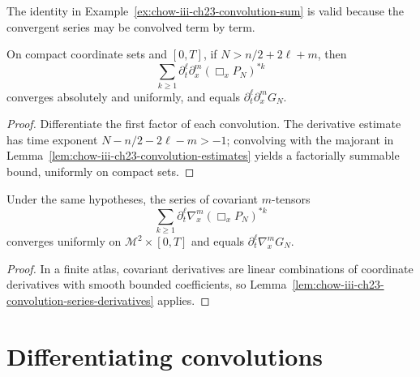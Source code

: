 \begin{example}
\label{ex:chow-iii-ch23-convolution-series-commutes}
The identity in Example~\ref{ex:chow-iii-ch23-convolution-sum} is valid because
the convergent series may be convolved term by term.
\end{example}

\begin{lemma}
\label{lem:chow-iii-ch23-convolution-series-derivatives}
On compact coordinate sets and $[0,T]$, if $N>n/2+2\ell+m$, then
\[
\sum_{k\ge1}\partial_t^\ell\partial_x^m(\Box_xP_N)^{*k}
\]
converges absolutely and uniformly, and equals
\(\partial_t^\ell\partial_x^mG_N\).
\end{lemma}
\begin{proof}
Differentiate the first factor of each convolution.  The derivative estimate
has time exponent $N-n/2-2\ell-m>-1$; convolving with the majorant in
Lemma~\ref{lem:chow-iii-ch23-convolution-estimates} yields a factorially summable
bound, uniformly on compact sets.
\end{proof}

\begin{lemma}
\label{lem:chow-iii-ch23-convolution-series-covariant}
Under the same hypotheses, the series of covariant $m$-tensors
\[
\sum_{k\ge1}\partial_t^\ell\nabla_x^m(\Box_xP_N)^{*k}
\]
converges uniformly on $\mathcal M^2\times[0,T]$ and equals
\(\partial_t^\ell\nabla_x^mG_N\).
\end{lemma}
\begin{proof}
In a finite atlas, covariant derivatives are linear combinations of coordinate
derivatives with smooth bounded coefficients, so Lemma~\ref{lem:chow-iii-ch23-convolution-series-derivatives} applies.
\end{proof}

\section{Differentiating convolutions}


